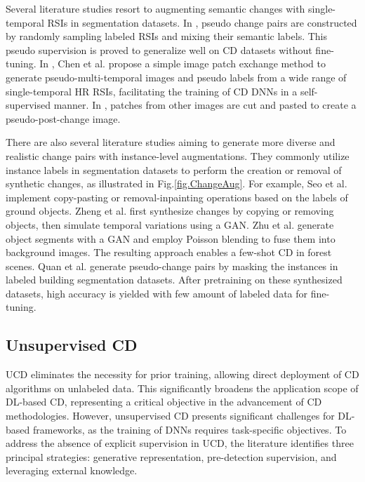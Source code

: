 Several literature studies resort to augmenting semantic changes with single-temporal RSIs in segmentation datasets. In \cite{zheng2021change}, pseudo change pairs are constructed by randomly sampling labeled RSIs and mixing their semantic labels. This pseudo supervision is proved to generalize well on CD datasets without fine-tuning. In \cite{chen2023exchange}, Chen et al. propose a simple image patch exchange method to generate pseudo-multi-temporal images and pseudo labels from a wide range of single-temporal HR RSIs, facilitating the training of CD DNNs in a self-supervised manner. In \cite{gao2024building}, patches from other images are cut and pasted to create a pseudo-post-change image.

There are also several literature studies aiming to generate more diverse and realistic change pairs with instance-level augmentations. They commonly utilize instance labels in segmentation datasets to perform the creation or removal of synthetic changes, as illustrated in Fig.\ref{fig.ChangeAug}. For example, Seo et al. \cite{seo2023selfpair} implement copy-pasting or removal-inpainting operations based on the labels of ground objects. Zheng et al. \cite{zheng2023scalable} first synthesize changes by copying or removing objects, then simulate temporal variations using a GAN. Zhu et al. \cite{zhu2023data} generate object segments with a GAN and employ Poisson blending to fuse them into background images. The resulting approach enables a few-shot CD in forest scenes. Quan et al. \cite{quan2023unified} generate pseudo-change pairs by masking the instances in labeled building segmentation datasets. After pretraining on these synthesized datasets, high accuracy is yielded with few amount of labeled data for fine-tuning.

\subsection{Unsupervised CD}

\par UCD eliminates the necessity for prior training, allowing direct deployment of CD algorithms on unlabeled data. This significantly broadens the application scope of DL-based CD, representing a critical objective in the advancement of CD methodologies. However, unsupervised CD presents significant challenges for DL-based frameworks, as the training of DNNs requires task-specific objectives. To address the absence of explicit supervision in UCD, the literature identifies three principal strategies: generative representation, pre-detection supervision, and leveraging external knowledge.

